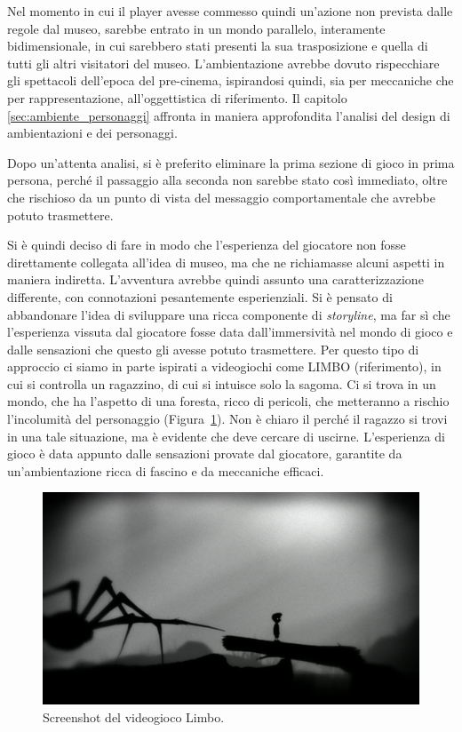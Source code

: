Nel momento in cui il player avesse commesso quindi un’azione non prevista dalle regole dal museo, sarebbe entrato in un mondo parallelo, interamente bidimensionale, in cui sarebbero stati presenti la sua trasposizione e quella di tutti gli altri visitatori del museo.
L’ambientazione avrebbe dovuto rispecchiare gli spettacoli dell’epoca del pre-cinema, ispirandosi quindi, sia per meccaniche che per rappresentazione, all’oggettistica di riferimento.
Il capitolo \ref{sec:ambiente_personaggi} affronta in maniera approfondita l’analisi del design di ambientazioni e dei personaggi.

Dopo un’attenta analisi, si è preferito eliminare la prima sezione di gioco in prima persona, perché il passaggio alla seconda non sarebbe stato così immediato, oltre che rischioso da un punto di vista del messaggio comportamentale che avrebbe potuto trasmettere.

Si è quindi deciso di fare in modo che l’esperienza del giocatore non fosse direttamente collegata all’idea di museo, ma che ne richiamasse alcuni aspetti in maniera indiretta.
L’avventura avrebbe quindi assunto una caratterizzazione differente, con connotazioni pesantemente esperienziali. Si è pensato di abbandonare l’idea di sviluppare una ricca componente di \textit{storyline}, ma far sì che l’esperienza vissuta dal giocatore fosse data dall’immersività nel mondo di gioco e dalle sensazioni che questo gli avesse potuto trasmettere.
Per questo tipo di approccio ci siamo in parte ispirati a videogiochi come LIMBO (riferimento), in cui si controlla un ragazzino, di cui si intuisce solo la sagoma. Ci si trova in un mondo, che ha l’aspetto di una foresta, ricco di pericoli, che metteranno a rischio l’incolumità del personaggio (Figura~\ref{fig:level_design_limbo}). Non è chiaro il perché il ragazzo si trovi in una tale situazione, ma è evidente che deve cercare di uscirne. L’esperienza di gioco è data appunto dalle sensazioni provate dal giocatore, garantite da un’ambientazione ricca di fascino e da meccaniche efficaci.

\begin{figure}%
	\centering
	\includegraphics[width= 0.8\columnwidth]{images/gameDesign/38_limbo.jpg}
	\caption{Screenshot del videogioco Limbo.}
	\label{fig:level_design_limbo}
\end{figure}


